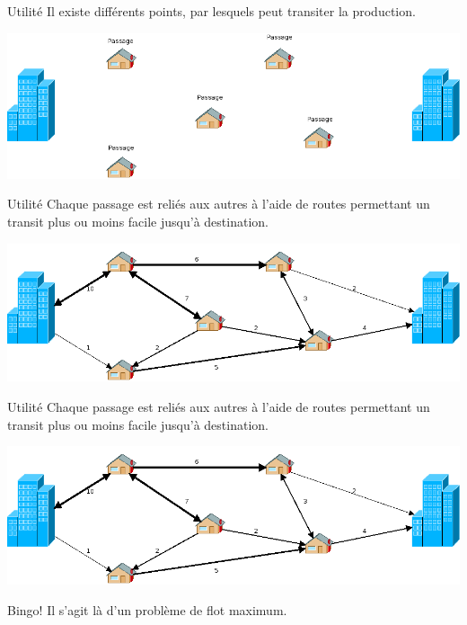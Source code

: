\documentclass[hyperref={},
xcolor={dvipsnames,svgnames,table},10pt]{beamer}
\begin{document}
\begin{frame}{Utilité}
	Il existe différents points, par lesquels peut transiter la production.

	\begin{center}
		\includegraphics[scale=0.32]{img/etape2.png}
	\end{center}
\end{frame}

\begin{frame}{Utilité}
	Chaque passage est reliés aux autres à l'aide de routes permettant un transit plus ou moins facile
	jusqu'à destination.

	\begin{center}
		\includegraphics[scale=0.32]{img/exemple.png}
	\end{center}
\end{frame}

\begin{frame}{Utilité}
	Chaque passage est reliés aux autres à l'aide de routes permettant un transit plus ou moins facile
	jusqu'à destination.

	\begin{center}
		\includegraphics[scale=0.32]{img/exemple.png}
	\end{center}

	\begin{alertblock}{Bingo!}
		Il s'agit là d'un problème de flot maximum.
	\end{alertblock}
\end{frame}
\end{document}

